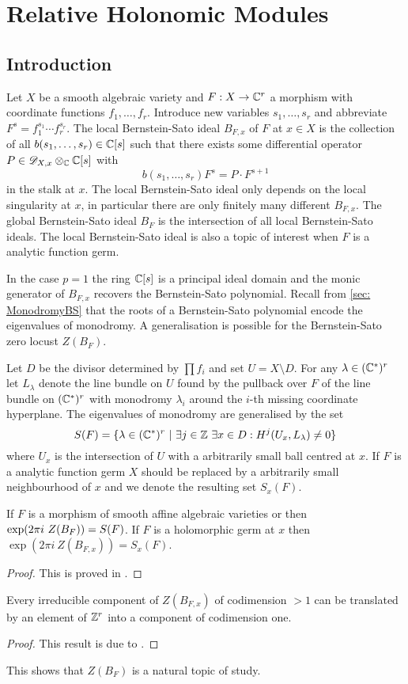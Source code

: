 \chapter{Relative Holonomic Modules}\label{ch: ChapterRelHol}
\section{Introduction}\label{sec: IntoductionChapterRelative}
Let $X$ be a smooth algebraic variety and $F:X\to \mathbb{C}^r$ a morphism with coordinate functions $f_1,\ldots, f_r$.
Introduce new variables $s_1,\ldots, s_r$ and abbreviate $F^s = f_1^{s_1}\cdots f_r^{s_r}$.
The local Bernstein-Sato ideal $B_{F,x}$ of $F$ at $x\in X$ is the collection of all $b(s_1,\ldots,s_r)\in \mathbb{C}[s]$ such that there exists some differential operator $P\in \mathscr{D}_{X,x}\otimes_{\mathbb{C}}\mathbb{C}[s]$ with
$$b(s_1,\ldots,s_r) F^s =  P\cdot F^{s + 1}$$
in the stalk at $x$.
The local Bernstein-Sato ideal only depends on the local singularity at $x$, in particular there are only finitely many different $B_{F,x}$.
The global Bernstein-Sato ideal $B_F$ is the intersection of all local Bernstein-Sato ideals.
The local Bernstein-Sato ideal is also a topic of interest when $F$ is a analytic function germ.

In the case $p=1$ the ring $\mathbb{C}[s]$ is a principal ideal domain and the monic generator of $B_{F,x}$ recovers the Bernstein-Sato polynomial.
Recall from \cref{sec: MonodromyBS} that the roots of a Bernstein-Sato polynomial encode the eigenvalues of monodromy.
A generalisation is possible for the Bernstein-Sato zero locust $Z(B_F)$.

Let $D$ be the divisor determined by $\prod f_i$ and set $U= X\setminus D$.
For any $\lambda \in (\mathbb{C}^*)^r$ let $L_\lambda$ denote the line bundle on $U$ found by the pullback over $F$ of the line bundle on $(\mathbb{C}^*)^r$ with monodromy $\lambda_i$ around the $i$-th missing coordinate hyperplane.
The eigenvalues of monodromy are generalised by the set
$$S(F) = \{\lambda \in (\mathbb{C}^*)^r \ \vert\  \exists j\in \mathbb{Z}\  \exists x\in D: H^j(U_x,L_\lambda) \neq 0\} $$
where $U_x$ is the intersection of $U$ with a arbitrarily small ball centred at $x$.
If $F$ is a analytic function germ $X$ should be replaced by a arbitrarily small neighbourhood of $x$ and we denote the resulting set $S_x(F)$.
\begin{theorem}
  If $F$ is a morphism of smooth affine algebraic varieties or then $\exp(2\pi i\ Z(\allowbreak B_F)) = S(F)$. If $F$ is a holomorphic germ at $x$ then $\exp(2\pi i\ Z(B_{F,x})) = S_x(F)$.
\end{theorem}
\begin{proof}
  This is proved in \cite{budur2019zero}.
\end{proof}
\begin{theorem}
  Every irreducible component of $Z(B_{F,x})$ of codimension $>1$ can be translated by an element of $\mathbb{Z}^r$ into a component of codimension one.
\end{theorem}
\begin{proof}
  This result is due to \cite{maisonobe2016filtration}.
\end{proof}
This shows that $Z(B_{F})$ is a natural topic of study.

